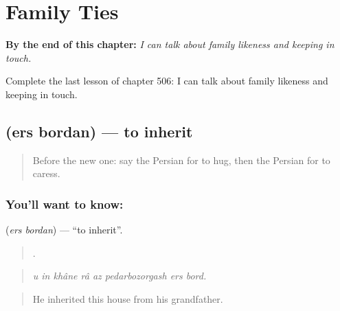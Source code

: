 
\chapter{Family Ties}
\label{ch:fa-family-ties}

\begin{chapteropening}
\textbf{By the end of this chapter:} \emph{I can talk about family likeness and keeping in touch.}

Complete the last lesson of chapter 506: I can talk about family likeness and keeping in touch.
\end{chapteropening}

\section[\texorpdfstring{\fa{ارث} \fa{بردن} (ers bordan)}{ارث بردن (ers bordan)}]{  (ers bordan) — to inherit}

\label{lesson:FA-C506-ers-bordan}



\begin{quote}
Before the new one: say the Persian for to hug, then the Persian for to caress.
\end{quote}

\subsection*{You'll want to know:  }
\textbf{ } (\emph{ers bordan}) — \textquotedblleft{}to inherit\textquotedblright{}.

\begin{quote}
       .
\end{quote}

\begin{quote}
\emph{u in khâne râ az pedarbozorgash ers bord.}
\end{quote}

\begin{quote}
He inherited this house from his grandfather.
\end{quote}

